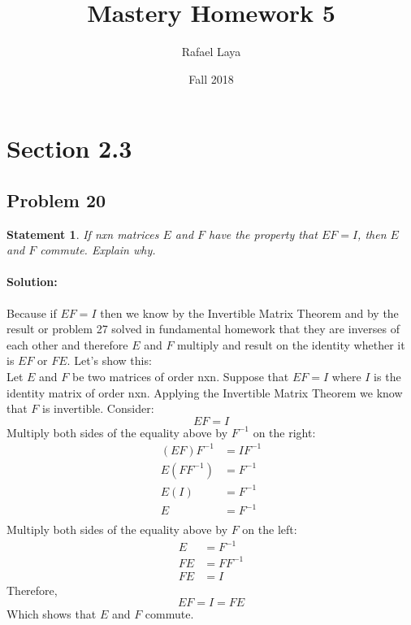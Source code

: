 \documentclass[12pt, letterpaper]{article}
\title{Mastery Homework 5}
\author{Rafael Laya}
\date{Fall 2018}
\theoremstyle{statement}
\theoremstyle{statement}
\newtheorem*{atmStat}{Statement}
\newenvironment{Solution}{\noindent\ignorespaces\paragraph{Solution:}}{\hfill \ding{122}\par\noindent}
\begin{document}
    \maketitle
    
    \section*{Section 2.3}
    \subsection*{Problem 20}
    \begin{atmStat}
    If nxn matrices $E$ and $F$ have the property that $EF=I$, then $E$ and $F$ commute. Explain why.
    \end{atmStat}
    \begin{Solution}
    Because if $EF=I$ then we know by the Invertible Matrix Theorem and by the result or problem 27 solved in fundamental homework that they are inverses of each other and therefore $E$ and $F$ multiply and result on the identity whether it is $EF$ or $FE$. Let's show this: \\
    
    Let $E$ and $F$ be two matrices of order nxn. Suppose that $EF=I$ where $I$ is the identity matrix of order nxn. Applying the Invertible Matrix Theorem we know that $F$ is invertible. Consider: 
    $$EF=I$$
    Multiply both sides of the equality above by $F^{-1}$ on the right:
    \begin{align*}
        (EF)F^{-1} &= IF^{-1} \\
        E(FF^{-1}) &= F^{-1} \\ 
        E(I) &= F^{-1} \\ 
        E &= F^{-1} \\
    \end{align*}
    Multiply both sides of the equality above by $F$ on the left:
    \begin{align*}
        E &= F^{-1} \\
        FE &= FF^{-1} \\
        FE &= I
    \end{align*}
    Therefore, 
    $$EF=I=FE$$
    Which shows that $E$ and $F$ commute.
    \end{Solution}
    
\end{document}
